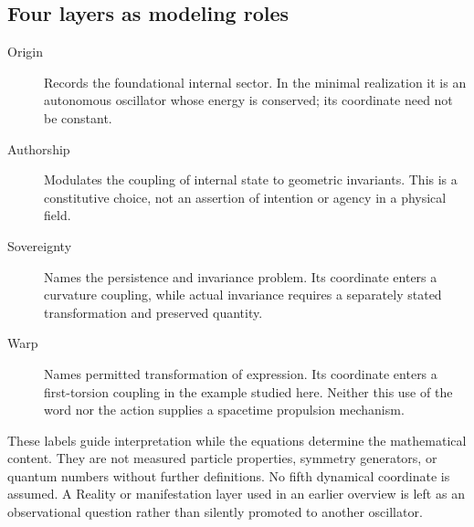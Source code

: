 \documentclass[11pt]{article}
\begin{document}
\subsection{Four layers as modeling roles}
\begin{description}
\item[Origin] Records the foundational internal sector. In the minimal realization it is an autonomous oscillator whose energy is conserved; its coordinate need not be constant.
\item[Authorship] Modulates the coupling of internal state to geometric invariants. This is a constitutive choice, not an assertion of intention or agency in a physical field.
\item[Sovereignty] Names the persistence and invariance problem. Its coordinate enters a curvature coupling, while actual invariance requires a separately stated transformation and preserved quantity.
\item[Warp] Names permitted transformation of expression. Its coordinate enters a first-torsion coupling in the example studied here. Neither this use of the word nor the action supplies a spacetime propulsion mechanism.
\end{description}
These labels guide interpretation while the equations determine the mathematical content. They are not measured particle properties, symmetry generators, or quantum numbers without further definitions. No fifth dynamical coordinate is assumed. A Reality or manifestation layer used in an earlier overview\cite{overview} is left as an observational question rather than silently promoted to another oscillator.
\end{document}
